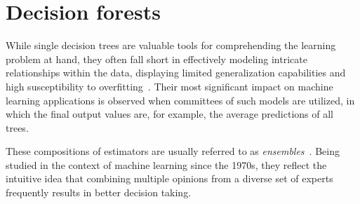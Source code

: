 


\section{Decision forests}
\label{sec:decision forests}

While single decision trees are valuable tools for comprehending the learning problem at hand, they often fall short in effectively modeling intricate relationships within the data, displaying limited generalization capabilities and high susceptibility to overfitting~\cite{breiman2001random,chen2016xgboost}.  %
%
Their most significant impact on machine learning applications is observed when committees of such models are utilized, in which the final output values
are, for example, the average predictions of all trees.

These compositions of estimators are usually referred to as \emph{ensembles}~\cite{dietterich2000ensemble,breiman2001random,polikar2006ensemble}.
Being studied in the context of machine learning since the 1970s, they reflect the intuitive idea that combining multiple opinions from a diverse set of experts frequently results in better decision taking. %

